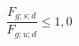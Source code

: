 \documentclass[12pt]{article}
\begin{document}
\begin{displaymath}
\frac {F_{g;s;d}} {F_{g;u;d}} \leq 1,0
\end{displaymath}
\end{document}
